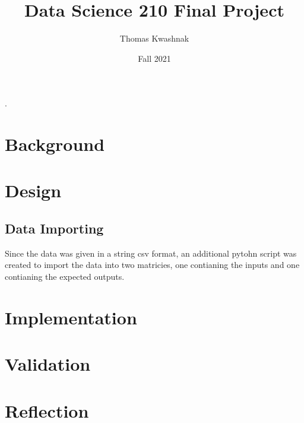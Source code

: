 \documentclass[10pt]{article}
\title{Data Science 210 Final Project}
\author{Thomas Kwashnak}
\date{Fall 2021}
\begin{document}
\maketitle
\setlength{\parindent}{0pt}.
\setlength{\parskip}{\baselineskip}
\lstset{numbers=left, numberstyle=\footnotesize, frame=l} 


\section{Background}
\section{Design}

\subsection{Data Importing}
Since the data was given in a string csv format, an additional pytohn script was created to import the data into two matricies, one contianing the inputs and one contianing the expected outputs.


\section{Implementation}
\section{Validation}
\section{Reflection}
\end{document}

